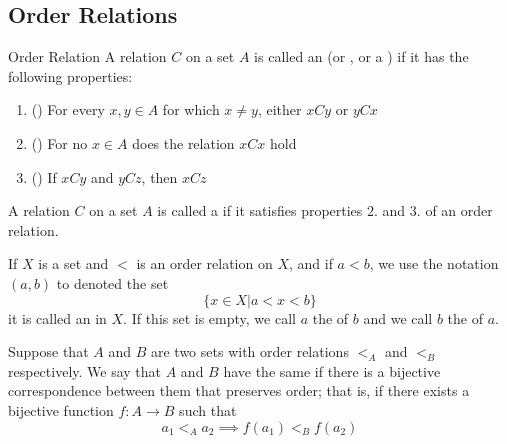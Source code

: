 \documentclass[12pt, a4paper, oneside, openright, titlepage]{book}
\begin{document}
\begin{appendices}
    \subsection{Order Relations}

    \begin{definition}{Order Relation}
        A relation $C$ on a set $A$ is called an  (or , or a ) if it has the following properties: \begin{enumerate}
            \item () For every $x,y \in A$ for which $x \neq y$, either $xCy$ or $yCx$
            \item () For no $x \in A$ does the relation $xCx$ hold
            \item () If $xCy$ and $yCz$, then $xCz$
        \end{enumerate}
    \end{definition}

    \begin{definition}
        A relation $C$ on a set $A$ is called a  if it satisfies properties $2.$ and $3.$ of an order relation.
    \end{definition}

    
    \begin{definition}
        If $X$ is a set and $<$ is an order relation on $X$, and if $a < b$, we use the notation $(a,b)$ to denoted the set \begin{equation*}
            \{x \in X\vert a < x < b\}
        \end{equation*}
        it is called an  in $X$. If this set is empty, we call $a$ the  of $b$ and we call $b$ the  of $a$.
    \end{definition}

    \begin{definition}
        Suppose that $A$ and $B$ are two sets with order relations $<_A$ and $<_B$ respectively. We say that $A$ and $B$ have the same  if there is a bijective correspondence between them that preserves order; that is, if there exists a bijective function $f:A\rightarrow B$ such that \begin{equation*}
            a_1 <_A a_2 \implies f(a_1) <_B f(a_2)
        \end{equation*}
    \end{definition}


\end{appendices}
\end{document}
